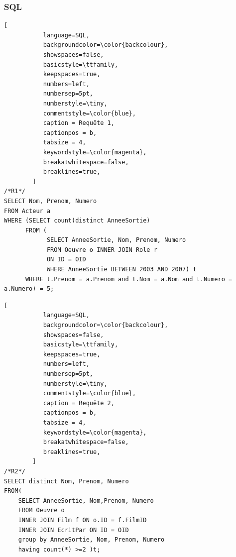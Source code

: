 \documentclass[10pt,a4paper]{article}
\begin{document}
\subsubsection{SQL}
\begin{lstlisting}[
           language=SQL,
           backgroundcolor=\color{backcolour},
           showspaces=false,
           basicstyle=\ttfamily,
           keepspaces=true,                 
           numbers=left,                    
           numbersep=5pt,
           numberstyle=\tiny,
           commentstyle=\color{blue},
           caption = Requête 1,
           captionpos = b, 
           tabsize = 4,
           keywordstyle=\color{magenta},
           breakatwhitespace=false,         
           breaklines=true,
        ]
/*R1*/
SELECT Nom, Prenom, Numero
FROM Acteur a
WHERE (SELECT count(distinct AnneeSortie)
      FROM (
			SELECT AnneeSortie, Nom, Prenom, Numero
			FROM Oeuvre o INNER JOIN Role r
			ON ID = OID
	  		WHERE AnneeSortie BETWEEN 2003 AND 2007) t
	  WHERE t.Prenom = a.Prenom and t.Nom = a.Nom and t.Numero = a.Numero) = 5;
\end{lstlisting}
\begin{lstlisting}[
           language=SQL,
           backgroundcolor=\color{backcolour},
           showspaces=false,
           basicstyle=\ttfamily,
           keepspaces=true,                 
           numbers=left,                    
           numbersep=5pt,
           numberstyle=\tiny,
           commentstyle=\color{blue},
           caption = Requête 2,
           captionpos = b,
           tabsize = 4,
           keywordstyle=\color{magenta},
           breakatwhitespace=false,         
           breaklines=true,
        ]
/*R2*/
SELECT distinct Nom, Prenom, Numero
FROM(
	SELECT AnneeSortie, Nom,Prenom, Numero
	FROM Oeuvre o
	INNER JOIN Film f ON o.ID = f.FilmID
	INNER JOIN EcritPar ON ID = OID
	group by AnneeSortie, Nom, Prenom, Numero
	having count(*) >=2 )t;
\end{lstlisting}
\newpage
\end{document}
